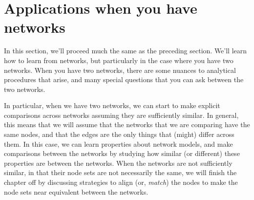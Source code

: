 \chapter{Applications when you have networks}
\label{sec:ch8}

In this section, we'll proceed much the same as the preceding section. We'll learn how to learn from networks, but particularly in the case where you have two networks. When you have two networks, there are some nuances to analytical procedures that arise, and many special questions that you can ask between the two networks. 

In particular, when we have two networks, we can start to make explicit comparisons across networks assuming they are sufficiently similar. In general, this means that we will assume that the networks that we are comparing have the same nodes, and that the edges are the only things that (might) differ across them. In this case, we can learn properties about network models, and make comparisons between the networks by studying how similar (or different) these properties are between the networks. When the networks are not sufficiently similar, in that their node sets are not necessarily the same, we will finish the chapter off by discussing strategies to align (or, \textit{match}) the nodes to make the node sets near equivalent between the networks. 






